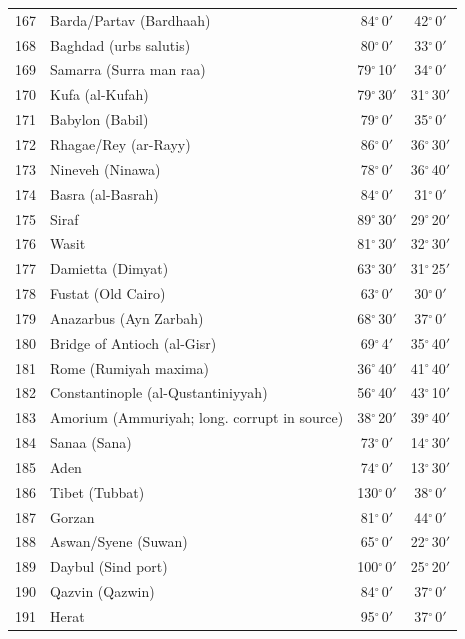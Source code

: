 \documentclass[10pt,a4paper]{article}
\begin{document}
\begin{longtable}{r >{\raggedright\arraybackslash}p{8.5cm} c c}
167 & Barda/Partav (Bardhaah) & 84$^\circ$\,0$'$ & 42$^\circ$\,0$'$\\
168 & Baghdad (urbs salutis) & 80$^\circ$\,0$'$ & 33$^\circ$\,0$'$\\
169 & Samarra (Surra man raa) & 79$^\circ$\,10$'$ & 34$^\circ$\,0$'$\\
170 & Kufa (al-Kufah) & 79$^\circ$\,30$'$ & 31$^\circ$\,30$'$\\
171 & Babylon (Babil) & 79$^\circ$\,0$'$ & 35$^\circ$\,0$'$\\
172 & Rhagae/Rey (ar-Rayy) & 86$^\circ$\,0$'$ & 36$^\circ$\,30$'$\\
173 & Nineveh (Ninawa) & 78$^\circ$\,0$'$ & 36$^\circ$\,40$'$\\
174 & Basra (al-Basrah) & 84$^\circ$\,0$'$ & 31$^\circ$\,0$'$\\
175 & Siraf & 89$^\circ$\,30$'$ & 29$^\circ$\,20$'$\\
176 & Wasit & 81$^\circ$\,30$'$ & 32$^\circ$\,30$'$\\
177 & Damietta (Dimyat) & 63$^\circ$\,30$'$ & 31$^\circ$\,25$'$\\
178 & Fustat (Old Cairo) & 63$^\circ$\,0$'$ & 30$^\circ$\,0$'$\\
179 & Anazarbus (Ayn Zarbah) & 68$^\circ$\,30$'$ & 37$^\circ$\,0$'$\\
180 & Bridge of Antioch (al-Gisr) & 69$^\circ$\,4$'$ & 35$^\circ$\,40$'$\\
181 & Rome (Rumiyah maxima) & 36$^\circ$\,40$'$ & 41$^\circ$\,40$'$\\
182 & Constantinople (al-Qustantiniyyah) & 56$^\circ$\,40$'$ & 43$^\circ$\,10$'$\\
183 & Amorium (Ammuriyah; long. corrupt in source) & 38$^\circ$\,20$'$ & 39$^\circ$\,40$'$\\
184 & Sanaa (Sana) & 73$^\circ$\,0$'$ & 14$^\circ$\,30$'$\\
185 & Aden & 74$^\circ$\,0$'$ & 13$^\circ$\,30$'$\\
186 & Tibet (Tubbat) & 130$^\circ$\,0$'$ & 38$^\circ$\,0$'$\\
187 & Gorzan & 81$^\circ$\,0$'$ & 44$^\circ$\,0$'$\\
188 & Aswan/Syene (Suwan) & 65$^\circ$\,0$'$ & 22$^\circ$\,30$'$\\
189 & Daybul (Sind port) & 100$^\circ$\,0$'$ & 25$^\circ$\,20$'$\\
190 & Qazvin (Qazwin) & 84$^\circ$\,0$'$ & 37$^\circ$\,0$'$\\
191 & Herat & 95$^\circ$\,0$'$ & 37$^\circ$\,0$'$\\

\end{longtable}
\end{document}
